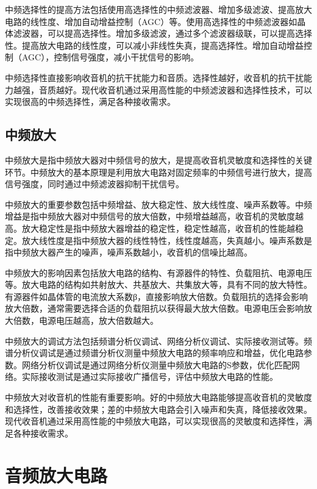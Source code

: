 \documentclass[12pt,UTF8]{ctexbook}
\begin{document}
中频选择性的提高方法包括使用高选择性的中频滤波器、增加多级滤波、提高放大电路的线性度、增加自动增益控制（AGC）等。使用高选择性的中频滤波器如晶体滤波器，可以提高选择性。增加多级滤波，通过多个滤波器级联，可以提高选择性。提高放大电路的线性度，可以减小非线性失真，提高选择性。增加自动增益控制（AGC），控制信号强度，减小干扰信号的影响。

中频选择性直接影响收音机的抗干扰能力和音质。选择性越好，收音机的抗干扰能力越强，音质越好。现代收音机通过采用高性能的中频滤波器和选择性技术，可以实现很高的中频选择性，满足各种接收需求。

\subsection{中频放大}

中频放大是指中频放大器对中频信号的放大，是提高收音机灵敏度和选择性的关键环节。中频放大的基本原理是利用放大电路对固定频率的中频信号进行放大，提高信号强度，同时通过中频滤波器抑制干扰信号。

中频放大的重要参数包括中频增益、放大稳定性、放大线性度、噪声系数等。中频增益是指中频放大器对中频信号的放大倍数，中频增益越高，收音机的灵敏度越高。放大稳定性是指中频放大器增益的稳定性，稳定性越高，收音机的性能越稳定。放大线性度是指中频放大器的线性特性，线性度越高，失真越小。噪声系数是指中频放大器产生的噪声，噪声系数越小，收音机的信噪比越高。

中频放大的影响因素包括放大电路的结构、有源器件的特性、负载阻抗、电源电压等。放大电路的结构如共射放大、共基放大、共集放大等，具有不同的放大特性。有源器件如晶体管的电流放大系数β，直接影响放大倍数。负载阻抗的选择会影响放大倍数，通常需要选择合适的负载阻抗以获得最大放大倍数。电源电压会影响放大倍数，电源电压越高，放大倍数越大。

中频放大的调试方法包括频谱分析仪调试、网络分析仪调试、实际接收测试等。频谱分析仪调试是通过频谱分析仪测量中频放大电路的频率响应和增益，优化电路参数。网络分析仪调试是通过网络分析仪测量中频放大电路的S参数，优化匹配网络。实际接收测试是通过实际接收广播信号，评估中频放大电路的性能。

中频放大对收音机的性能有重要影响。好的中频放大电路能够提高收音机的灵敏度和选择性，改善接收效果；差的中频放大电路会引入噪声和失真，降低接收效果。现代收音机通过采用高性能的中频放大电路，可以实现很高的灵敏度和选择性，满足各种接收需求。

\section{音频放大电路}
\end{document}
